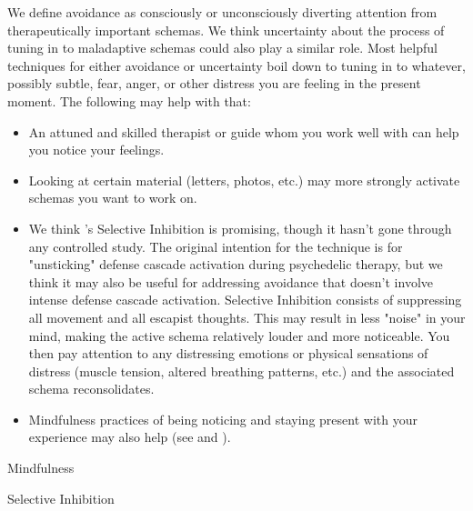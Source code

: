 \documentclass[12pt,letterpaper]{book}
\begin{document}
We define avoidance as consciously or unconsciously diverting attention from therapeutically important schemas. We think uncertainty about the process of tuning in to maladaptive schemas could also play a similar role. Most helpful techniques for either avoidance or uncertainty boil down to tuning in to whatever, possibly subtle, fear, anger, or other distress you are feeling in the present moment. The following may help with that:
\begin{itemize}
	\item An attuned and skilled therapist or guide whom you work well with can help you notice your feelings.
	\item Looking at certain material (letters, photos, etc.) may more strongly activate schemas you want to work on.
	\item \label{selectiveInhibition} We think \textcite{razviPSIP}'s Selective Inhibition is promising, though it hasn't gone through any controlled study. The original intention for the technique is for "unsticking" defense cascade activation during psychedelic therapy, but we think it may also be useful for addressing avoidance that doesn't involve intense defense cascade activation. Selective Inhibition consists of suppressing all movement and all escapist thoughts. This may result in less "noise" in your mind, making the active schema relatively louder and more noticeable. You then pay attention to any distressing emotions or physical sensations of distress (muscle tension, altered breathing patterns, etc.) and the associated schema reconsolidates.
	\item Mindfulness practices of being noticing and staying present with your experience may also help (see \textcite{rain} and \textcite{bodyscan}).
\end{itemize}

Mindfulness

Selective Inhibition
\end{document}
